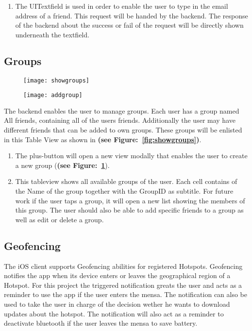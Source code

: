 \begin{enumerate}
\item The UITextfield is used in order to enable the user to type in the email address of a friend. This request will be handed by the backend. The response of the backend about the success or fail of the request will be directly shown underneath the textfield.
\end{enumerate}

\subsection{Groups}

\begin{figure}
\centering
\begin{minipage}{.5\textwidth}
  \centering
  \texttt{[image: showgroups]}
  \label{fig:showgroups}
\end{minipage}%
\begin{minipage}{.5\textwidth}
  \centering
  \texttt{[image: addgroup]}
  \label{fig:addgroup}
\end{minipage}
\end{figure}

The backend enables the user to manage groups. Each user has a group named All friends, containing all of the users friends. Additionally the user may have different friends that can be added to own groups. These groups will be enlisted in this Table View as shown in \textbf{(see Figure:~\ref{fig:showgroups})}. 

\begin{enumerate}
 \item The plus-button will open a new view modally that enables the user to create a new group (\textbf{(see Figure:~\ref{fig:addgroup}}).
 \item This tableview shows all available groups of the user. Each cell contains of the Name of the group together with the GroupID as subtitle. For future work if the user taps a group, it will open a new list showing the members of this group. The user should also be able to add specific friends to a group as well as edit or delete a group.
\end{enumerate} 

\subsection{Geofencing}
The iOS client supports Geofencing abilities for registered Hotspots. Geofencing notifies the app when its device enters or leaves the geographical region of a Hotspot. For this project the triggered notification greats the user and acts as a reminder to use the app if the user enters the mensa. The notification can also be used to take the user in charge of the decision wether he wants to download updates about the hotspot. The notification will also act as a reminder to deactivate bluetooth if the user leaves the mensa to save battery.


